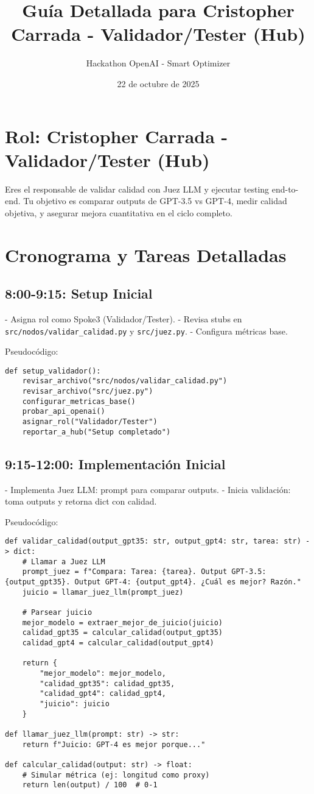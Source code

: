 \documentclass{article}
\title{Guía Detallada para Cristopher Carrada - Validador/Tester (Hub)}
\author{Hackathon OpenAI - Smart Optimizer}
\date{22 de octubre de 2025}
\begin{document}
\maketitle

\section{Rol: Cristopher Carrada - Validador/Tester (Hub)}
Eres el responsable de validar calidad con Juez LLM y ejecutar testing end-to-end. Tu objetivo es comparar outputs de GPT-3.5 vs GPT-4, medir calidad objetiva, y asegurar mejora cuantitativa en el ciclo completo.

\section{Cronograma y Tareas Detalladas}

\subsection{8:00-9:15: Setup Inicial}
- Asigna rol como Spoke3 (Validador/Tester).
- Revisa stubs en \texttt{src/nodos/validar\_calidad.py} y \texttt{src/juez.py}.
- Configura métricas base.

Pseudocódigo:
\begin{lstlisting}
def setup_validador():
    revisar_archivo("src/nodos/validar_calidad.py")
    revisar_archivo("src/juez.py")
    configurar_metricas_base()
    probar_api_openai()
    asignar_rol("Validador/Tester")
    reportar_a_hub("Setup completado")
\end{lstlisting}

\subsection{9:15-12:00: Implementación Inicial}
- Implementa Juez LLM: prompt para comparar outputs.
- Inicia validación: toma outputs y retorna dict con calidad.

Pseudocódigo:
\begin{lstlisting}
def validar_calidad(output_gpt35: str, output_gpt4: str, tarea: str) -> dict:
    # Llamar a Juez LLM
    prompt_juez = f"Compara: Tarea: {tarea}. Output GPT-3.5: {output_gpt35}. Output GPT-4: {output_gpt4}. ¿Cuál es mejor? Razón."
    juicio = llamar_juez_llm(prompt_juez)
    
    # Parsear juicio
    mejor_modelo = extraer_mejor_de_juicio(juicio)
    calidad_gpt35 = calcular_calidad(output_gpt35)
    calidad_gpt4 = calcular_calidad(output_gpt4)
    
    return {
        "mejor_modelo": mejor_modelo,
        "calidad_gpt35": calidad_gpt35,
        "calidad_gpt4": calidad_gpt4,
        "juicio": juicio
    }

def llamar_juez_llm(prompt: str) -> str:
    return f"Juicio: GPT-4 es mejor porque..."

def calcular_calidad(output: str) -> float:
    # Simular métrica (ej: longitud como proxy)
    return len(output) / 100  # 0-1
\end{lstlisting}
\end{document}
